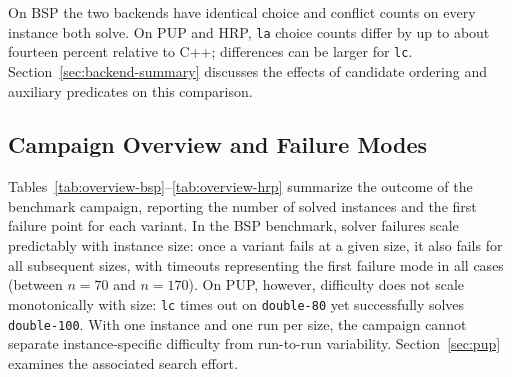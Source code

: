On BSP the two backends have identical choice and conflict counts on every instance both solve. On PUP and HRP, \texttt{la} choice counts differ by up to about fourteen percent relative to C++; differences can be larger for \texttt{lc}. Section~\ref{sec:backend-summary} discusses the effects of candidate ordering and auxiliary predicates on this comparison.

\subsection{Campaign Overview and Failure Modes}
\label{sec:campaign-overview}

Tables~\ref{tab:overview-bsp}--\ref{tab:overview-hrp} summarize the outcome of the benchmark campaign, reporting the number of solved instances and the first failure point for each variant.
In the BSP benchmark, solver failures scale predictably with instance size: once a variant fails at a given size, it also fails for all subsequent sizes, with timeouts representing the first failure mode in all cases (between $n=70$ and $n=170$). On PUP, however, difficulty does not scale monotonically with size: \texttt{lc} times out on \texttt{double-80} yet successfully solves \texttt{double-100}. With one instance and one run per size, the campaign cannot separate instance-specific difficulty from run-to-run variability. Section~\ref{sec:pup} examines the associated search effort.

